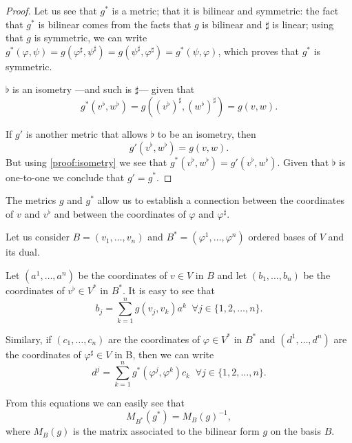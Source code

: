 \begin{proof}
	Let us see that $g^*$ is a metric; \ie that it is bilinear and symmetric: the fact that $g^*$ is bilinear comes from the facts that $g$ is bilinear and $\sharp$ is linear; using that $g$ is symmetric, we can write $g^*(\varphi, \psi) = g(\varphi^\sharp, \psi^\sharp) = g(\psi^\sharp, \varphi^\sharp) = g^*(\psi, \varphi)$, which proves that $g^*$ is symmetric.
	
	$\flat$ is an isometry ---and such is $\sharp$--- given that
	\begin{equation}
		\label{proof:isometry}
		g^*(v^\flat, w^\flat) = g\left(\left(v^\flat\right)^\sharp, \left(w^\flat\right)^\sharp\right) = g(v, w).
	\end{equation}

	If $g'$ is another metric that allows $\flat$ to be an isometry, then \[g'(v^\flat, w^\flat) = g(v, w).\] But using \autoref{proof:isometry} we see that $g^*(v^\flat, w^\flat) = g'(v^\flat, w^\flat)$. Given that $\flat$ is one\nobreakdash-to\nobreakdash-one we conclude that $g' = g^*$.
\end{proof}

The metrics $g$ and $g^*$ allow us to establish a connection between the coordinates of $v$ and $v^\flat$ and between the coordinates of $\varphi$ and $\varphi^\sharp$.

Let us consider $B = (v_1, \dots, v_n)$ and $B^* = (\varphi^1, \dots, \varphi^n)$ ordered bases of $V$ and its dual.

Let $(a^1, \dots, a^n)$ be the coordinates of $v \in V$ in $B$ and let $(b_1, \dots, b_n)$ be the coordinates of $v^\flat \in V^*$ in $B^*$. It is easy to see that
\begin{equation}
	\label{eq:coordV}
	b_j = \sum_{k=1}^n g(v_j, v_k) a^k \;\; \forall j \in \{1,2,\dots,n\}.
\end{equation}

Similary, if $(c_1, \dots, c_n)$ are the coordinates of $\varphi \in V^*$ in $B^*$ and $(d^1, \dots, d^n)$ are the coordinates of $\varphi^\sharp \in V$ in B, then we can write
\begin{equation}
	\label{eq:coordV*}
	d^j = \sum_{k=1}^n g^*(\varphi^j, \varphi^k) c_k \;\; \forall j \in \{1,2,\dots,n\}.
\end{equation}

From this equations we can easily see that
\[
	M_{B^*}(g^*) = M_B(g)^{-1},
\]
where $M_B(g)$ is the matrix associated to the bilinear form $g$ on the basis $B$.

